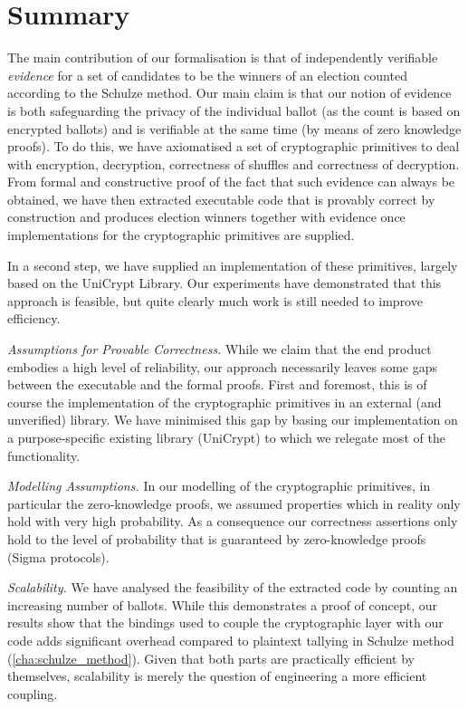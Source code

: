 \section{Summary}
\label{sec:summary_homomorphic}

\noindent The main contribution of our formalisation is that of independently
verifiable \emph{evidence} for a set of candidates to be the winners
of an election counted according to the Schulze method. Our main
claim is that our notion of evidence is both safeguarding the
privacy of the individual ballot (as the count is based on encrypted
ballots) and is verifiable at the same time (by means of zero
knowledge proofs). To do this, we have axiomatised a set of
cryptographic primitives to deal with encryption, decryption,
correctness of shuffles and correctness of decryption. From formal
and constructive proof of the fact that such evidence can always be
obtained, we have then extracted executable code that is provably
correct by construction and produces election winners together with
evidence once implementations for the cryptographic primitives are
supplied.

In a second step, we have supplied an implementation of these
primitives, largely based on the UniCrypt Library. Our experiments
have demonstrated that this approach is feasible, but quite clearly
much work is still needed to improve efficiency. 

\smallskip\noindent\emph{Assumptions for Provable Correctness.}
While we claim that the end product embodies a high level of
reliability, our approach necessarily leaves some gaps between the
executable and the formal proofs. First and foremost, this is of
course the implementation of the cryptographic primitives in an
external (and unverified) library. We have minimised this gap by
basing our implementation on a purpose-specific existing library
(UniCrypt) to which we relegate most of the functionality. 


\smallskip\noindent\emph{Modelling Assumptions.} In our modelling of
the cryptographic primitives, in particular the zero-knowledge
proofs, we assumed properties which in reality only hold with
very high probability. As a
consequence our correctness assertions only hold to the level
of probability that is guaranteed by zero-knowledge proofs (Sigma 
protocols).

\smallskip\noindent\emph{Scalability.} We have analysed the
feasibility of the extracted code by counting an increasing number
of ballots. While this demonstrates a proof of concept, our results
show that the bindings used to couple the cryptographic layer with
our code adds significant overhead compared
to plaintext tallying in Schulze method (\ref{cha:schulze_method}).  Given that both
parts are practically efficient by themselves, scalability is merely
the question of engineering a more efficient coupling. 


